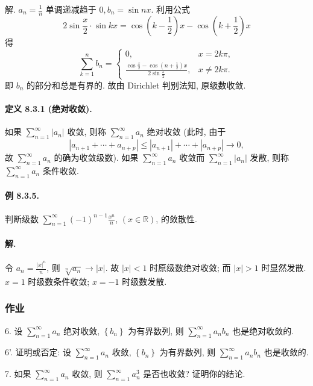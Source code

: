 解. $a_{n}=\frac{1}{n}$ 单调递减趋于 $0,b_{n}=\sin nx$. 利用公式 
\[
2\sin\frac{x}{2}\cdot\sin kx=\cos\left(k-\frac{1}{2}\right)x-\cos\left(k+\frac{1}{2}\right)x
\]
得 
\[
\sum_{k=1}^{n}b_{n}=\begin{cases}
	0, & x=2k\pi,\\
	\frac{\cos\frac{x}{2}-\cos\left(n+\frac{1}{2}\right)x}{2\sin\frac{x}{2}}, & x\neq2k\pi.
\end{cases}
\]
即 $b_{n}$ 的部分和总是有界的. 故由 Dirichlet 判别法知, 原级数收敛.

\paragraph{定义 8.3.1 (绝对收敛). }

如果 $\sum_{n=1}^{\infty}\left|a_{n}\right|$ 收敛, 则称 $\sum_{n=1}^{\infty}a_{n}$
绝对收敛 (此时, 由于 
\[
\left|a_{n+1}+\cdots+a_{n+p}\right|\leqslant\left|a_{n+1}\right|+\cdots+\left|a_{n+p}\right|\rightarrow0,
\]
故 $\sum_{n=1}^{\infty}a_{n}$ 的确为收敛级数). 如果 $\sum_{n=1}^{\infty}a_{n}$
收敛而 $\sum_{n=1}^{\infty}\left|a_{n}\right|$ 发散, 则称 $\sum_{n=1}^{\infty}a_{n}$
条件收敛.

\paragraph{例 8.3.5. }

判断级数 $\sum_{n=1}^{\infty}(-1)^{n-1}\frac{x^{n}}{n}$, $(x\in\mathbb{R})$,
的敛散性. 

\paragraph{解. }

令 $a_{n}=\frac{|x|^{n}}{n}$, 则 $\sqrt[n]{a_{n}}\rightarrow|x|$.
故 $|x|<1$ 时原级数绝对收敛; 而 $|x|>1$ 时显然发散. $x=1$ 时级数条件收敛; $x=-1$ 时级数发散.

\subsubsection{作业}

6. 设 $\sum_{n=1}^{\infty}a_{n}$ 绝对收敛, $\left\{ b_{n}\right\} $ 为有界数列,
则 $\sum_{n=1}^{\infty}a_{n}b_{n}$ 也是绝对收敛的. 

6'. 证明或否定: 设 $\sum_{n=1}^{\infty}a_{n}$ 收敛, $\left\{ b_{n}\right\} $
为有界数列, 则 $\sum_{n=1}^{\infty}a_{n}b_{n}$ 也是收敛的. 

7. 如果 $\sum_{n=1}^{\infty}a_{n}$ 收敛, 则 $\sum_{n=1}^{\infty}a_{n}^{3}$
是否也收敛? 证明你的结论. 

